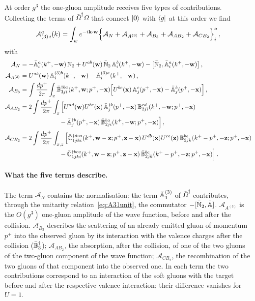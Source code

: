 At order $g^3$ the one-gluon amplitude receives five types of contributions. Collecting the terms of $\bar\Omega^\dagger\Omega$ that connect $\ket0$ with $\bra{g}$ at this order we find
\begin{align}\label{eq:A3amp}
\mathcal A^a_{(3)\,i}(k)=\int_w e^{-i\mathbf{k}\cdot\mathbf{w}}\Big\{\mathcal A_{N}+\mathcal A_{A^{(3)}}+\mathcal A_{B_3}+\mathcal A_{AB_2}+\mathcal A_{CB_2}\Big\}^a_i\,,
\end{align}
with
\begin{align}
\mathcal A_{N}&=-\bar{\mathbb{A}}^a_i(k^+,-\mathbf{w})\,\mathbb{N}_2+U^{ab}(\mathbf{w})\,\bar{\mathbb{N}}_2\,\mathbb{A}^b_i(k^+,-\mathbf{w})-\big[\bar{\mathbb{N}}_2,\bar{\mathbb{A}}^a_i(k^+,-\mathbf{w})\big]\,,
\notag\\
\mathcal A_{A^{(3)}}&=U^{ab}(\mathbf{w})\,\mathbb{A}^{(3)b}_i(k^+,-\mathbf{w})-\bar{\mathbb{A}}^{(3)a}_i(k^+,-\mathbf{w})\,,
\notag\\
\mathcal A_{B_3}&=\int\frac{dp^+}{2\pi}\int_x\bar{\mathbb{B}}^{\dagger ba}_{3ji}(k^+,\mathbf{w};p^+,-\mathbf{x})\Big[U^{bc}(\mathbf{x})\,\mathbb{A}^c_j(p^+,-\mathbf{x})-\bar{\mathbb{A}}^b_j(p^+,-\mathbf{x})\Big]\,,
\notag\\
\mathcal A_{AB_2}&=2\int\frac{dp^+}{2\pi}\int_x\Big[U^{ad}(\mathbf{w})U^{bc}(\mathbf{x})\,\bar{\mathbb{A}}^{\dagger b}_j(p^+,-\mathbf{x})\,\mathbb{B}^{cd}_{2ji}(k^+,-\mathbf{w};p^+,-\mathbf{x})
\notag\\&\hspace{2.2cm}
-\bar{\mathbb{A}}^{\dagger b}_j(p^+,-\mathbf{x})\,\bar{\mathbb{B}}^{ba}_{2ji}(k^+,-\mathbf{w};p^+,-\mathbf{x})\Big]\,,
\notag\\
\mathcal A_{CB_2}&=2\int\frac{dp^+}{2\pi}\int_{x,z}\Big[\bar{\mathbb{C}}^{\dagger dca}_{1jki}(k^+,\mathbf{w}-\mathbf{z};p^+,\mathbf{z}-\mathbf{x})\,U^{db}(\mathbf{x})U^{ce}(\mathbf{z})\,\mathbb{B}^{be}_{2jk}(k^+-p^+,-\mathbf{z};p^+,-\mathbf{x})
\notag\\&\hspace{2.2cm}
-\bar{\mathbb{C}}^{\dagger bca}_{1jki}(k^+,\mathbf{w}-\mathbf{z};p^+,\mathbf{z}-\mathbf{x})\,\bar{\mathbb{B}}^{bc}_{2jk}(k^+-p^+,-\mathbf{z};p^+,-\mathbf{x})\Big]\,.
\end{align}
\paragraph{What the five terms describe.} The term $\mathcal A_N$ contains the normalisation: the term $\bar{\mathbb{A}}^{(3)}_1$ of $\bar\Omega^\dagger$ contributes, through the unitarity relation~\eqref{eq:A31unit}, the commutator $-[\bar{\mathbb{N}}_2,\bar{\mathbb{A}}]$. $\mathcal A_{A^{(3)}}$ is the $O(g^3)$ one-gluon amplitude of the wave function, before and after the collision. $\mathcal A_{B_3}$ describes the scattering of an already emitted gluon of momentum $p^+$ into the observed gluon by its interaction with the valence charges after the collision ($\bar{\mathbb{B}}_3^\dagger$); $\mathcal A_{AB_2}$, the absorption, after the collision, of one of the two gluons of the two-gluon component of the wave function; $\mathcal A_{CB_2}$, the recombination of the two gluons of that component into the observed one. In each term the two contributions correspond to an interaction of the soft gluons with the target before and after the respective valence interaction; their difference vanishes for $U=1$.

